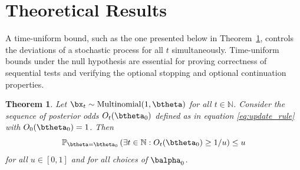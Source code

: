 \documentclass[11pt]{article}
\newtheorem{thm}{Theorem}[section]
\begin{document}
\section{Theoretical Results}
\label{sec:theory}
A time-uniform bound, such as the one presented below in Theorem~\ref{thm:type_1_error}, controls the deviations of a stochastic process for all $t$ simultaneously.
Time-uniform bounds under the null hypothesis are essential for proving correctness of sequential tests and verifying the optional stopping and optional continuation properties.
\begin{thm}  
  \label{thm:type_1_error}
  Let $\bx_t\sim \mathrm{Multinomial}(1,\btheta)$ for all $t \in \mathbb{N}$.
Consider the sequence of posterior odds $O_t(\btheta_0)$ defined as in equation \eqref{eq:update_rule} with $O_0(\btheta_0)=1$. Then
\begin{equation}
  \label{eq:type_1_error}
  \mathbb{P}_{\btheta = \btheta_0}\left( \exists t \in \mathbb{N}: O_t(\btheta_0) \geq 1/u \right) \leq u
\end{equation}
for all $u \in [0,1]$ and for all choices of $\balpha_0$.
\end{thm}
\end{document}
